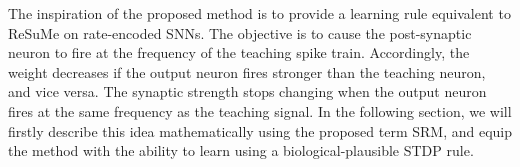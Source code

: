 The inspiration of the proposed method is to provide a learning rule equivalent to ReSuMe on rate-encoded SNNs.
The objective is to cause the post-synaptic neuron to fire at the frequency of the teaching spike train. 
Accordingly, the weight decreases if the output neuron fires stronger than the teaching neuron, and vice versa.
The synaptic strength stops changing when the output neuron fires at the same frequency as the teaching signal.
In the following section, we will firstly describe this idea mathematically using the proposed term SRM, and equip the method with the ability to learn using a biological-plausible STDP rule.


